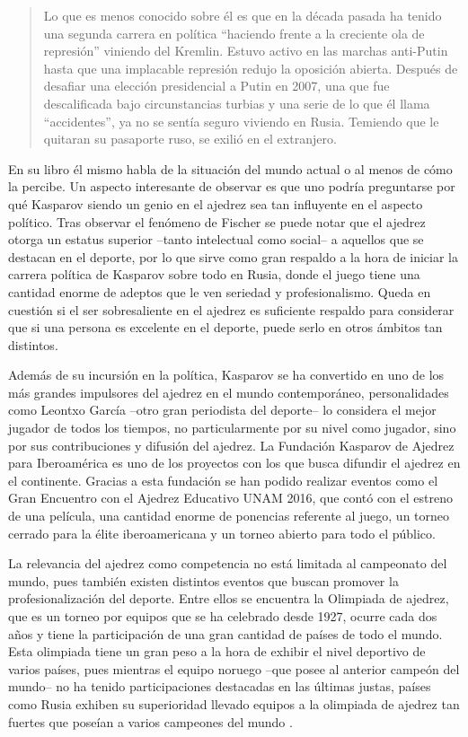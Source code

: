 \documentclass[twoside,openright,12pt,a4paper,spanish]{book}
\begin{document}
\begin{quote} \singlespace
    Lo que es menos conocido sobre él es que en la década pasada ha tenido una segunda carrera en política ``haciendo frente a la creciente ola de represión'' viniendo del Kremlin. Estuvo activo en las marchas anti-Putin hasta que una implacable represión redujo la oposición abierta. Después de desafiar una elección presidencial a Putin en 2007, una que fue descalificada bajo circunstancias turbias y una serie de lo que él llama ``accidentes'', ya no se sentía seguro viviendo en Rusia. Temiendo que le quitaran su pasaporte ruso, se exilió en el extranjero. \cite{winter_is_coming}
\end{quote}

En su libro \'el mismo habla de la situaci\'on del mundo actual o al menos de cómo la percibe. Un aspecto interesante de observar es que uno podr\'ia preguntarse por qu\'e Kasparov siendo un genio en el ajedrez sea tan influyente en el aspecto político. Tras observar el fen\'omeno de Fischer se puede notar que el ajedrez otorga un estatus superior --tanto intelectual como social-- a aquellos que se destacan en el deporte, por lo que sirve como gran respaldo a la hora de iniciar la carrera pol\'itica de Kasparov sobre todo en Rusia, donde el juego tiene una cantidad enorme de adeptos que le ven seriedad y profesionalismo. Queda en cuestión si el ser sobresaliente en el ajedrez es suficiente respaldo para considerar que si una persona es excelente en el deporte, puede serlo en otros ámbitos tan distintos.

Adem\'as de su incursi\'on en la pol\'itica, Kasparov se ha convertido en uno de los m\'as grandes impulsores del ajedrez en el mundo contempor\'aneo, personalidades como Leontxo Garc\'ia --otro gran periodista del deporte-- lo considera el mejor jugador de todos los tiempos, no particularmente por su nivel como jugador, sino por sus contribuciones y difusión del ajedrez. La Fundación Kasparov de Ajedrez para Iberoamérica es uno de los proyectos con los que busca difundir el ajedrez en el continente. Gracias a esta fundación se han podido realizar eventos como el Gran Encuentro con el Ajedrez Educativo UNAM 2016, que contó con el estreno de una película, una cantidad enorme de ponencias referente al juego, un torneo cerrado para la \'elite iberoamericana y un torneo abierto para todo el público.

La relevancia del ajedrez como competencia no est\'a limitada al campeonato del mundo, pues tambi\'en existen distintos eventos que buscan promover la profesionalizaci\'on del deporte. Entre ellos se encuentra la Olimpiada de ajedrez, que es un torneo por equipos que se ha celebrado desde 1927, ocurre cada dos años y tiene la participación de una gran cantidad de países de todo el mundo. Esta olimpiada tiene un gran peso a la hora de exhibir el nivel deportivo de varios países, pues mientras el equipo noruego --que posee al anterior campeón del mundo-- no ha tenido participaciones destacadas en las últimas justas, pa\'ises como Rusia exhiben su superioridad llevado equipos a la olimpiada de ajedrez tan fuertes que pose\'ian a varios campeones del mundo \cite{cinco_campeones}.
\end{document}
